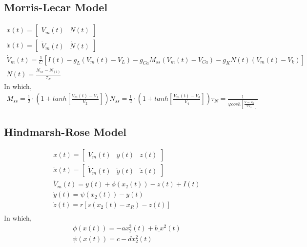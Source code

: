 \subsection{Morris-Lecar Model}
\begin{align}
    x(t) = \begin{bmatrix}V_m(t) & N(t)\end{bmatrix} \label{eq:smm-ml-1} \\
    \dot x(t) = \begin{bmatrix}\dot V_m(t) & \dot N(t)\end{bmatrix} \label{eq:smm-ml-2} \\
    \dot V_m(t) = \frac{1}{C}[I(t) - g_L(V_m(t) - V_L) - g_{Ca}M_{ss}(V_m(t) - V_{Ca})-g_KN(t)(V_m(t)-V_k)]\label{eq:smm-ml-3} \\
    \dot N(t) = \frac{N_{ss} - N_(t)}{\tau_N}\label{eq:smm-ml-3}
\end{align}
In which,
\begin{align}
M_{ss} = \frac12\cdot (1+tanh[\frac{V_m(t)-V_1}{V_2}])
N_{ss} = \frac12\cdot (1+tanh[\frac{V_m(t)-V_3}{V_4}])
\tau_N = \frac{1}{\varphi cosh[\frac{V-V_3}{2V_4}]}
\end{align}

\subsection{Hindmarsh-Rose Model}
\begin{align}
    x(t) = \begin{bmatrix} V_m(t) & y(t) & z(t) \end{bmatrix} \label{eq:smm-hr-1} \\
    \dot x(t) = \begin{bmatrix} \dot V_m(t) & \dot y(t) & \dot z(t) \end{bmatrix} \label{eq:smm-hr-1} \\
    \dot V_m(t) = y(t) + \phi(x_2(t)) - z(t) + I(t) \\
    \dot y(t) = \psi(x_2(t)) - y(t) \\
    \dot z(t) = r[s(x_2(t) - x_R)-z(t)] \\
\end{align}
In which,
\begin{align}
\phi(x(t)) = -ax_2^3(t) + b\_x^2(t) \\
\psi(x(t)) = c - dx_2^2(t) \\
\end{align}

